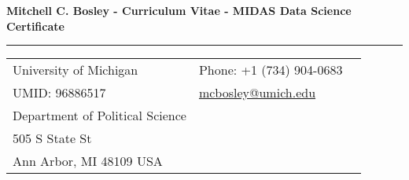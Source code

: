 \documentclass[letterpaper,11pt,oneside]{article}
\begin{document}

\noindent  \LARGE{\textbf{Mitchell C. Bosley - Curriculum Vitae - MIDAS Data Science Certificate}}  \\
\vspace{-2ex}
\hrule
\normalsize


\bigskip
\noindent \begin{tabular}{@{} l l l}
 University of Michigan & \hspace{1in} Phone: +1 (734) 904-0683\\
 UMID: 96886517 & \hspace{1in} \href{mailto:mcbosley@umich.edu}{mcbosley@umich.edu} \\
 Department of Political Science &  \\  
 505 S State St & \\ 
 Ann Arbor, MI 48109 USA & \\
\end{tabular}


\vspace{1em}
\end{document}
